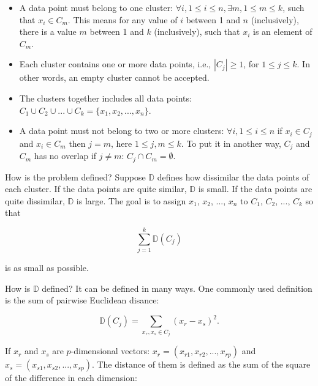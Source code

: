 \begin{itemize}
\item A data point must belong to one cluster: $\forall i, 1 \le i \le
  n, \exists m, 1 \le m \le k$, such that $x_i \in C_m$. This means
  for any value of $i$ between 1 and $n$ (inclusively), there is a
  value $m$ between 1 and $k$ (inclusively), such that $x_i$ is an
  element of $C_m$.

  
\item Each cluster contains one or more data points, i.e.,
  $|C_j| \ge 1$, for $1 \le j \le k$.  In other words, an
  empty cluster cannot be accepted.
  
\item The clusters together includes all data points: $C_1 \cup C_2
  \cup ... \cup C_k = \{x_1, x_2, ..., x_n\}$.

\item A data point must not belong to two or more clusters: $\forall
  i, 1 \le i \le n$ if $x_i \in C_j$ and $x_i \in C_m$ then $j = m$,
  here $1 \le j, m \le k$.  To put it in another way, $C_j$ and $C_m$
  has no overlap if $j \ne m$: $C_j \cap C_m = \emptyset$.
  
\end{itemize}

How is the problem defined? Suppose $\mathds{D}$ defines how
dissimilar the data points of each cluster.  If the data points are
quite similar, $\mathds{D}$ is small.  If the data points are quite
dissimilar, $\mathds{D}$ is large.  The goal is to assign
$x_1$, $x_2$, ..., $x_n$ to $C_1$, $C_2$, ..., $C_k$
so that

\begin{equation}
  \underset{j = 1}{\overset{k}{\sum}} \mathds{D}(C_j)
  \label{eqn:kmeancost1}
\end{equation}

is as small as possible.

How is $\mathds{D}$ defined?  It can be defined in many ways. One commonly
used definition is the sum of pairwise Euclidean disance:


\begin{equation}
\mathds{D}(C_j) = \underset{x_r, x_s \in C_j}{\sum} (x_r - x_s)^ 2.
\end{equation}

If $x_r$ and $x_s$ are $p$-dimensional vectors:
$x_r = (x_{r1}, x_{r2}, ..., x_{rp})$ and
$x_s = (x_{s1}, x_{s2}, ..., x_{sp})$.
The distance of them is defined as the sum of the square
of the difference in each dimension:

